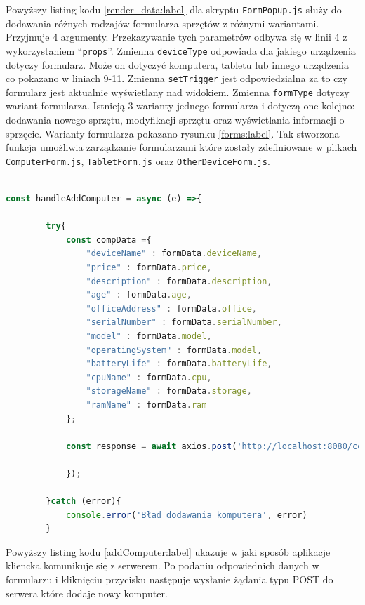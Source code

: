 Powyższy listing kodu \ref{render_data:label} dla skryptu \texttt{FormPopup.js}  służy do dodawania różnych rodzajów formularza sprzętów z różnymi wariantami. Przyjmuje 4 argumenty. Przekazywanie tych parametrów odbywa się w linii 4 z wykorzystaniem "`\texttt{props}"'. Zmienna \texttt{deviceType} odpowiada dla jakiego urządzenia dotyczy formularz. Może on dotyczyć komputera, tabletu lub innego urządzenia co pokazano w liniach 9-11. Zmienna \texttt{setTrigger} jest odpowiedzialna za to czy formularz jest aktualnie wyświetlany nad widokiem. Zmienna \texttt{formType} dotyczy wariant formularza. Istnieją 3 warianty jednego formularza i dotyczą one kolejno: dodawania nowego sprzętu, modyfikacji sprzętu oraz wyświetlania informacji o sprzęcie. Warianty formularza pokazano rysunku \ref{forms:label}. Tak stworzona funkcja umożliwia zarządzanie formularzami które zostały zdefiniowane w plikach \texttt{ComputerForm.js}, \texttt{TabletForm.js} oraz \texttt{OtherDeviceForm.js}.

\begin{lstlisting}[language=JavaScript, style=JavaScriptStyle,  caption={Przykładowe zapytanie do serwera dla formularza komputera}, label={addComputer:label}]

const handleAddComputer = async (e) =>{

        try{
            const compData ={
                "deviceName" : formData.deviceName,
                "price" : formData.price,
                "description" : formData.description,
                "age" : formData.age,
                "officeAddress" : formData.office,
                "serialNumber" : formData.serialNumber,
                "model" : formData.model,
                "operatingSystem" : formData.model,
                "batteryLife" : formData.batteryLife,
                "cpuName" : formData.cpu,
                "storageName" : formData.storage,
                "ramName" : formData.ram
            };

            const response = await axios.post('http://localhost:8080/computers/add', compData, {

            });

        }catch (error){
            console.error('Bład dodawania komputera', error)
        }

\end{lstlisting}

Powyższy listing kodu \ref{addComputer:label} ukazuje w jaki sposób aplikacje kliencka komunikuje się z serwerem. Po podaniu odpowiednich danych w formularzu i kliknięciu przycisku następuje wysłanie żądania typu POST do serwera które dodaje nowy komputer. 

